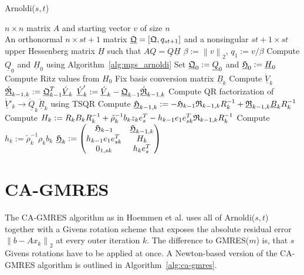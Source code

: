 \documentclass{scrartcl}
\numberwithin{equation}{section}
\newcommand{\norm}[1]{\left\lVert#1\right\rVert}
\begin{document}
\begin{algorithm}
\caption{Arnoldi($s,t$)}
\label{alg:arnoldi(s,t)}
\begin{algorithmic}[1]
    \REQUIRE $n \times n$ matrix $A$ and starting vector $v$ of size $n$\\
    \ENSURE An orthonormal $n \times st + 1$ matrix $\underline{\frak{Q}} = \left[\frak{Q},q_{st + 1}\right]$ and a nonsingular $st + 1 \times st$ upper Hessenberg matrix $\underline{H}$ such that $AQ = \underline{Q} \underline{H}$
    \STATE $\beta := \norm{v}_2$, $q_1 := v/\beta$
    		\STATE Compute $\underline{Q}_0$ and $\underline{H}_0$ using Algorithm~\ref{alg:mgs_arnoldi}
    		\STATE Set $\underline{\frak{Q}}_0 := \underline{Q}_0$ and $\underline{\frak{H}}_0 := \underline{H}_0$
			\STATE Compute Ritz values from $H_0$
    	\ELSE
    		\STATE Fix basis conversion matrix $\underline{B}_k$
    		\STATE Compute $\underline{\acute{V}}_k$
    		\STATE $\underline{\acute{\frak{R}}}_{k - 1, k} := \underline{\frak{Q}}^T_{k - 1} \underline{\acute{V}}_k$
    	\STATE $\underline{\acute{V}}_k' := \underline{\acute{V}}_k - \underline{\frak{Q}}_{k - 1} \underline{\acute{\frak{R}}}_{k - 1, k}$
    	\STATE Compute QR factorization of $\underline{\acute{V}}'_k \rightarrow \underline{\acute{Q}}_k \underline{\acute{R}}_k$ using TSQR
    	\STATE Compute $\underline{\frak{H}}_{k - 1, k} := - \frak{H}_{k - 1} \frak{R}_{k - 1, k} R^{-1}_k + \underline{\frak{R}}_{k - 1, k} \underline{B}_k R^{-1}_k$
		\STATE Compute $H_k := R_k B_k R^{-1}_k + \tilde{\rho}^{-1}_k b_k z_k e^T_s - h_{k-1} e_1 e^T_{sk} \frak{R}_{k-1,k} R^{-1}_k$
		\STATE Compute $h_k := \tilde{\rho}^{-1}_k \rho_k b_k$
    	\STATE $\underline{\frak{H}}_k : = 
    	\begin{pmatrix}
    		\frak{H}_{k - 1} & \underline{\frak{H}}_{k - 1, k}\\
    		h_{k - 1} e_1 e_{sk}^T & H_k\\
    		0_{1,sk} & h_k e^T_s
    	\end{pmatrix}$
    	\ENDIF
	\ENDFOR
\end{algorithmic}
\end{algorithm}

\section{CA-GMRES} \label{sec:ca-gmres}
The CA-GMRES algorithm as in Hoemmen et al. \cite{Hoemmen:2010:CKS:1970638} uses all of Arnoldi($s,t$) together with a Givens rotation scheme that exposes the absolute residual error $\norm{b - Ax_k}_2$ at every outer iteration $k$. The difference to GMRES($m$) is, that $s$ Givens rotations have to be applied at once. A Newton-based version of the CA-GMRES algorithm is outlined in Algorithm~\ref{alg:ca-gmres}.
\end{document}

